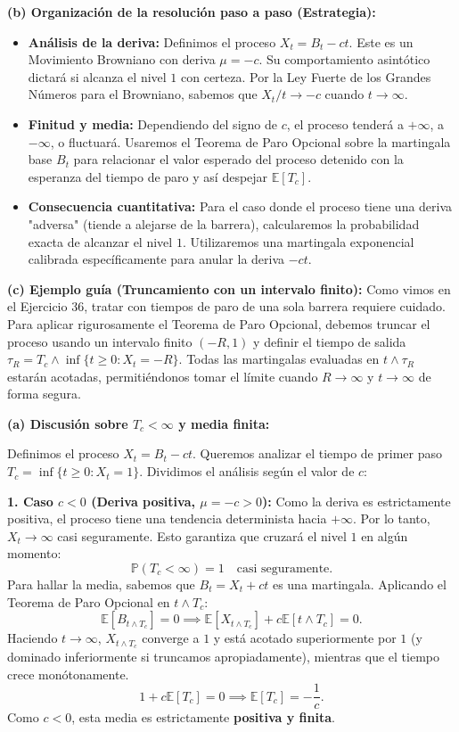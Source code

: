 \documentclass[11pt, letterpaper]{article}
\begin{document}
\begin{solucion}
    \textbf{(b) Organización de la resolución paso a paso (Estrategia):}
    \begin{itemize}
        \item[(i)] \textbf{Análisis de la deriva:} Definimos el proceso $X_t = B_t - ct$. Este es un Movimiento Browniano con deriva $\mu = -c$. Su comportamiento asintótico dictará si alcanza el nivel $1$ con certeza. Por la Ley Fuerte de los Grandes Números para el Browniano, sabemos que $X_t / t \to -c$ cuando $t \to \infty$.
        \item[(ii)] \textbf{Finitud y media:} Dependiendo del signo de $c$, el proceso tenderá a $+\infty$, a $-\infty$, o fluctuará. Usaremos el Teorema de Paro Opcional sobre la martingala base $B_t$ para relacionar el valor esperado del proceso detenido con la esperanza del tiempo de paro y así despejar $\mathbb{E}[T_c]$.
        \item[(iii)] \textbf{Consecuencia cuantitativa:} Para el caso donde el proceso tiene una deriva "adversa" (tiende a alejarse de la barrera), calcularemos la probabilidad exacta de alcanzar el nivel $1$. Utilizaremos una martingala exponencial calibrada específicamente para anular la deriva $-ct$.
    \end{itemize}

    \vspace{3mm}
    \textbf{(c) Ejemplo guía (Truncamiento con un intervalo finito):}
    Como vimos en el Ejercicio 36, tratar con tiempos de paro de una sola barrera requiere cuidado. Para aplicar rigurosamente el Teorema de Paro Opcional, debemos truncar el proceso usando un intervalo finito $(-R, 1)$ y definir el tiempo de salida $\tau_R = T_c \wedge \inf\{t \ge 0 : X_t = -R\}$. Todas las martingalas evaluadas en $t \wedge \tau_R$ estarán acotadas, permitiéndonos tomar el límite cuando $R \to \infty$ y $t \to \infty$ de forma segura.

    \vspace{3mm}
    \textbf{(a) Discusión sobre $T_c < \infty$ y media finita:}

    Definimos el proceso $X_t = B_t - ct$. Queremos analizar el tiempo de primer paso $T_c = \inf\{t \ge 0 : X_t = 1\}$. Dividimos el análisis según el valor de $c$:

    \textbf{1. Caso $c < 0$ (Deriva positiva, $\mu = -c > 0$):}
    Como la deriva es estrictamente positiva, el proceso tiene una tendencia determinista hacia $+\infty$. Por lo tanto, $X_t \to \infty$ casi seguramente. Esto garantiza que cruzará el nivel $1$ en algún momento:
    \[ \mathbb{P}(T_c < \infty) = 1 \quad \text{casi seguramente.} \]
    Para hallar la media, sabemos que $B_t = X_t + ct$ es una martingala. Aplicando el Teorema de Paro Opcional en $t \wedge T_c$:
    \[ \mathbb{E}[B_{t \wedge T_c}] = 0 \implies \mathbb{E}[X_{t \wedge T_c}] + c\mathbb{E}[t \wedge T_c] = 0. \]
    Haciendo $t \to \infty$, $X_{t \wedge T_c}$ converge a $1$ y está acotado superiormente por $1$ (y dominado inferiormente si truncamos apropiadamente), mientras que el tiempo crece monótonamente.
    \[ 1 + c\mathbb{E}[T_c] = 0 \implies \mathbb{E}[T_c] = -\frac{1}{c}. \]
    Como $c < 0$, esta media es estrictamente \textbf{positiva y finita}.


\end{solucion}
\end{document}

